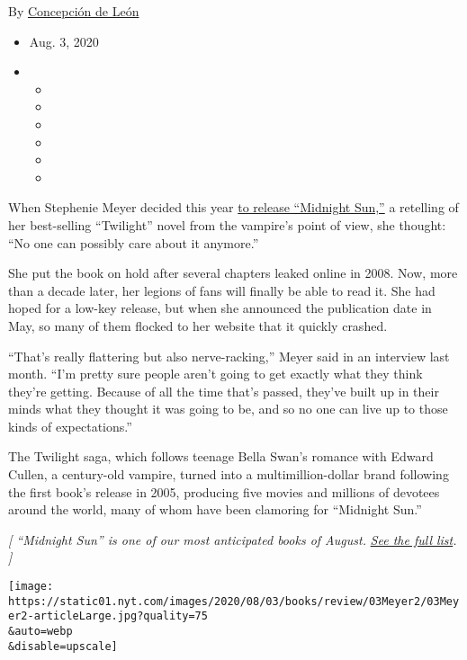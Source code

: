 By \href{https://www.nytimes.com/by/concepcion-de-leon}{Concepción de
León}

\begin{itemize}
\item
  Aug. 3, 2020
\item
  \begin{itemize}
  \item
  \item
  \item
  \item
  \item
  \item
  \end{itemize}
\end{itemize}

When Stephenie Meyer decided this year
\href{https://www.nytimes.com/2020/05/04/books/stephenie-meyer-midnight-sun-twilight.html}{to
release ``Midnight Sun,''} a retelling of her best-selling ``Twilight''
novel from the vampire's point of view, she thought: ``No one can
possibly care about it anymore.''

She put the book on hold after several chapters leaked online in 2008.
Now, more than a decade later, her legions of fans will finally be able
to read it. She had hoped for a low-key release, but when she announced
the publication date in May, so many of them flocked to her website that
it quickly crashed.

``That's really flattering but also nerve-racking,'' Meyer said in an
interview last month. ``I'm pretty sure people aren't going to get
exactly what they think they're getting. Because of all the time that's
passed, they've built up in their minds what they thought it was going
to be, and so no one can live up to those kinds of expectations.''

The Twilight saga, which follows teenage Bella Swan's romance with
Edward Cullen, a century-old vampire, turned into a multimillion-dollar
brand following the first book's release in 2005, producing five movies
and millions of devotees around the world, many of whom have been
clamoring for ``Midnight Sun.''

\emph{{[} ``Midnight Sun'' is one of our most anticipated books of
August.}
\href{https://www.nytimes.com/2020/07/30/books/new-august-books.html}{\emph{See
the full list}}\emph{. {]}}

\texttt{[image: https://static01.nyt.com/images/2020/08/03/books/review/03Meyer2/03Meyer2-articleLarge.jpg?quality=75\\\&auto=webp\\\&disable=upscale]}

